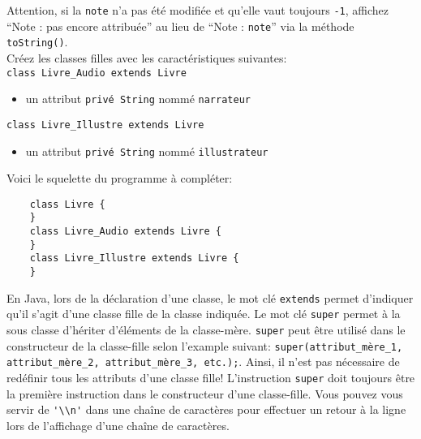 \begin{Exercice}[20 minutes]
Attention, si la \lstinline{note} n'a pas été modifiée et qu'elle vaut toujours \lstinline{-1}, affichez ``Note : pas encore attribuée'' au lieu de ``Note : \lstinline{note}'' via la méthode \lstinline{toString()}. \\
Créez les classes filles avec les caractéristiques suivantes:\\
\lstinline{class Livre_Audio extends Livre}
\begin{itemize}
	\item un attribut \lstinline{privé String} nommé \lstinline{narrateur}
\end{itemize}
\lstinline{class Livre_Illustre extends Livre}
\begin{itemize}
	\item un attribut \lstinline{privé String} nommé \lstinline{illustrateur}
\end{itemize}
Voici le squelette du programme à compléter:
\begin{lstlisting}
	class Livre {
	}
	class Livre_Audio extends Livre {
	}
	class Livre_Illustre extends Livre {
	}\end{lstlisting}
\begin{conseil}
En Java, lors de la déclaration d'une classe, le mot clé \lstinline{extends} permet d'indiquer qu'il s'agit d'une classe fille de la classe indiquée. 
Le mot clé \lstinline{super} permet à la sous classe d'hériter d'éléments de la classe-mère. \lstinline{super} peut être utilisé dans le constructeur de la classe-fille selon l'example suivant: \lstinline{super(attribut_mère_1, attribut_mère_2, attribut_mère_3, etc.);}. Ainsi, il n'est pas nécessaire de redéfinir tous les attributs d'une classe fille!
L'instruction \lstinline{super} doit toujours être la première instruction dans le constructeur d'une classe-fille.
Vous pouvez vous servir de \lstinline{'\\n'} dans une chaîne de caractères pour effectuer un retour à la ligne lors de l'affichage d'une chaîne de caractères.
\end{conseil}
\begin{solution}
	
\end{solution}
\end{Exercice}
